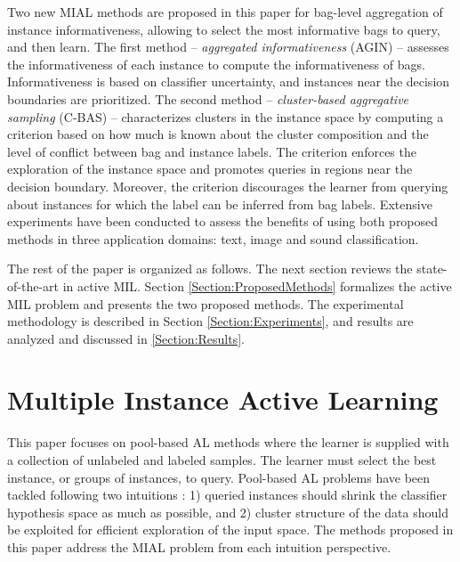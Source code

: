 \documentclass{article}
\begin{document}
Two new MIAL methods are proposed in this paper for bag-level aggregation of instance informativeness, allowing to  select the most informative bags to query, and then learn. The first method -- \textit{aggregated informativeness} (AGIN) -- assesses the informativeness of each instance to compute the informativeness of bags. Informativeness is based on classifier uncertainty, and instances near the decision boundaries are prioritized. The second method -- \textit{cluster-based aggregative sampling} (C-BAS) -- characterizes clusters in the instance space by computing a criterion based on how much is known about the cluster composition and the level of conflict between bag and instance labels. The criterion enforces the exploration of the instance space and promotes queries in regions near the decision boundary. Moreover, the criterion discourages the learner from querying about instances for which the label can be inferred from bag labels. Extensive experiments have been conducted to assess the benefits of using both proposed methods in three application domains: text, image and sound classification. 

The rest of the paper is organized as follows. The next section reviews the state-of-the-art in active MIL. Section \ref{Section:ProposedMethods} formalizes the active MIL problem and presents the two proposed methods. The experimental methodology is described in Section \ref{Section:Experiments}, and results are analyzed and discussed in \ref{Section:Results}.


\section{Multiple Instance Active Learning}


This paper focuses on pool-based AL methods \cite{Settles2009survey} where the learner is supplied with a collection of unlabeled and labeled samples. The learner must select the best instance, or groups of instances, to query. Pool-based AL problems have been tackled following two intuitions \cite{Dasgupta2011twofaces}: 1) queried instances should shrink the classifier hypothesis space as much as possible, and 2) cluster structure of the data should be exploited for efficient exploration of the input space. The methods proposed in this paper address the MIAL problem from each intuition perspective.
 
\end{document}
